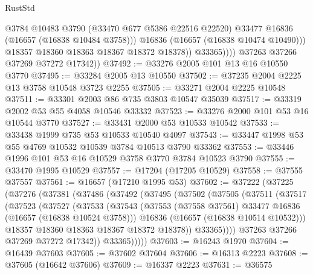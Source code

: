 \begin{lexlean}{RustStd}
\begin{coremodule}
                        @3784
                        @10483
                        @3790
                        (@33470 @677 @5386 @22516 @22520)
                        @33477
                        @16836
                        (@16657 (@16838 @10484 @3758)))
                      @16836
                      (@16657 (@16838 @10474 @10490)))
                    @18357
                    @18360
                    @18363
                    @18367
                    @18372
                    @18378))
                @33365))))
        @37263
        @37266
        @37269
        @37272
        @17342))
@37492 := @33276 @2005 @101 @13 @16 @10550 @3770
@37495 := @33284 @2005 @13 @10550
@37502 := @37235 @2004 @2225 @13 @3758 @10548 @3723 @2255
@37505 := @33271 @2004 @2225 @10548
@37511 := @33301 @2003 @86 @735 @3803 @10547 @35039
@37517 := @33319 @2002 @53 @55 @4058 @10546 @33332
@37523 := @33276 @2000 @101 @53 @16 @10544 @3770
@37527 := @33431 @2000 @53 @10533 @10542
@37533 := @33438 @1999 @735 @53 @10533 @10540 @4097
@37543 := @33447 @1998 @53 @55 @4769 @10532 @10539 @3784 @10513 @3790 @33362
@37553 := @33446 @1996 @101 @53 @16 @10529 @3758 @3770 @3784 @10523 @3790
@37555 := @33470 @1995 @10529
@37557 := @17204 (@17205 @10529)
@37558 := @37555 @37557
@37561 := @16657 (@17210 @1995 @53)
@37602 := @37222
    (@37225
      (@37276
        (@37381
          (@37486
            (@37492
              (@37495
                (@37502
                  (@37505
                    (@37511
                      (@37517
                        (@37523
                          (@37527
                            (@37533
                              (@37543
                                (@37553
                                  (@37558 @37561)
                                  @33477
                                  @16836
                                  (@16657 (@16838 @10524 @3758)))
                                @16836
                                (@16657 (@16838 @10514 @10532)))
                              @18357
                              @18360
                              @18363
                              @18367
                              @18372
                              @18378))
                          @33365))))
                  @37263
                  @37266
                  @37269
                  @37272
                  @17342))
              @33365)))))
@37603 := @16243 @1970
@37604 := @16439 @37603
@37605 := @37602 @37604
@37606 := @16313 @2223
@37608 := @37605 (@16642 @37606)
@37609 := @16337 @2223
@37631 := @36575

\end{coremodule}
\end{lexlean}
